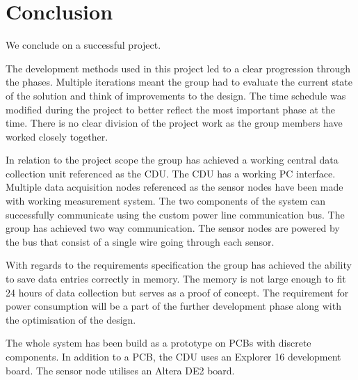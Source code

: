 \chapter{Conclusion}
We conclude on a successful project. 

The development methods used in this project led to a clear progression through the phases. Multiple iterations meant the group had to evaluate the current state of the solution and think of improvements to the design. The time schedule was modified during the project to better reflect the most important phase at the time. There is no clear division of the project work as the group members have worked closely together.

In relation to the project scope the group has achieved a working central data collection unit referenced as the CDU. The CDU has a working PC interface. Multiple data acquisition nodes referenced as the sensor nodes have been made with working measurement system. The two components of the system can successfully communicate using the custom power line communication bus. The group has achieved two way communication. The sensor nodes are powered by the bus that consist of a single wire going through each sensor.

With regards to the requirements specification the group has achieved the ability to save data entries correctly in memory. The memory is not large enough to fit 24 hours of data collection but serves as a proof of concept. The requirement for power consumption will be a part of the further development phase along with the optimisation of the design.

The whole system has been build as a prototype on PCBs with discrete components. In addition to a PCB, the CDU uses an Explorer 16 development board. The sensor node utilises an Altera DE2 board.